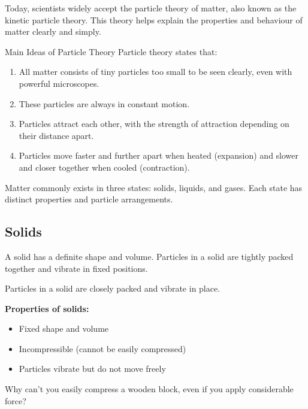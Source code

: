 \FloatBarrier
\1

Today, scientists widely accept the particle theory of matter, also known as the kinetic particle theory. This theory helps explain the properties and behaviour of matter clearly and simply.

\begin{keyconcept}{Main Ideas of Particle Theory}
Particle theory states that:
\begin{enumerate}
    \item All matter consists of tiny particles too small to be seen clearly, even with powerful microscopes.
    \item These particles are always in constant motion.
    \item Particles attract each other, with the strength of attraction depending on their distance apart.
    \item Particles move faster and further apart when heated (expansion) and slower and closer together when cooled (contraction).
\end{enumerate}
\end{keyconcept}

\FloatBarrier
\1

Matter commonly exists in three states: solids, liquids, and gases. Each state has distinct properties and particle arrangements.

\subsection{Solids}

A solid has a definite shape and volume. Particles in a solid are tightly packed together and vibrate in fixed positions.

\begin{marginfigure}
\caption{Particles in a solid are closely packed and vibrate in place.}
\end{marginfigure}

\textbf{Properties of solids:}
\begin{itemize}
    \item Fixed shape and volume
    \item Incompressible (cannot be easily compressed)
    \item Particles vibrate but do not move freely
\end{itemize}

\begin{stopandthink}
Why can't you easily compress a wooden block, even if you apply considerable force?
\end{stopandthink}

